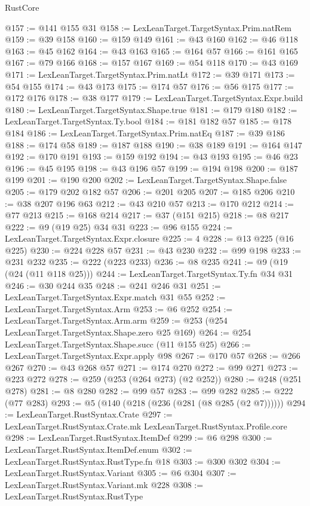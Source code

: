 \begin{lexlean}{RustCore}
\begin{coremodule}
@157 := @141 @155 @31
@158 := LexLeanTarget.TargetSyntax.Prim.natRem
@159 := @39 @158
@160 := @159 @149
@161 := @43 @160
@162 := @46 @118
@163 := @45 @162
@164 := @43 @163
@165 := @164 @57
@166 := @161 @165
@167 := @79 @166
@168 := @157 @167
@169 := @54 @118
@170 := @43 @169
@171 := LexLeanTarget.TargetSyntax.Prim.natLt
@172 := @39 @171
@173 := @54 @155
@174 := @43 @173
@175 := @174 @57
@176 := @56 @175
@177 := @172 @176
@178 := @38 @177
@179 := LexLeanTarget.TargetSyntax.Expr.build
@180 := LexLeanTarget.TargetSyntax.Shape.true
@181 := @179 @180
@182 := LexLeanTarget.TargetSyntax.Ty.bool
@184 := @181 @182 @57
@185 := @178 @184
@186 := LexLeanTarget.TargetSyntax.Prim.natEq
@187 := @39 @186
@188 := @174 @58
@189 := @187 @188
@190 := @38 @189
@191 := @164 @147
@192 := @170 @191
@193 := @159 @192
@194 := @43 @193
@195 := @46 @23
@196 := @45 @195
@198 := @43 @196 @57
@199 := @194 @198
@200 := @187 @199
@201 := @190 @200
@202 := LexLeanTarget.TargetSyntax.Shape.false
@205 := @179 @202 @182 @57
@206 := @201 @205
@207 := @185 @206
@210 := @38 @207 @196 @63
@212 := @43 @210 @57
@213 := @170 @212
@214 := @77 @213
@215 := @168 @214
@217 := @37 (@151 @215)
@218 := @8 @217
@222 := @9 (@19 @25) @34 @31
@223 := @96 @155
@224 := LexLeanTarget.TargetSyntax.Expr.closure
@225 := 4
@228 := @13 @225 (@16 @225)
@230 := @224 @228 @57
@231 := @43 @230
@232 := @99 @198
@233 := @231 @232
@235 := @222 (@223 @233)
@236 := @8 @235
@241 := @9 (@19 (@24 (@11 @118 @25)))
@244 := LexLeanTarget.TargetSyntax.Ty.fn @34 @31
@246 := @30 @244 @35
@248 := @241 @246 @31
@251 := LexLeanTarget.TargetSyntax.Expr.match @31 @55
@252 := LexLeanTarget.TargetSyntax.Arm
@253 := @6 @252
@254 := LexLeanTarget.TargetSyntax.Arm.arm
@259 := @253 (@254 LexLeanTarget.TargetSyntax.Shape.zero @25 @169)
@264 := @254 LexLeanTarget.TargetSyntax.Shape.succ (@11 @155 @25)
@266 := LexLeanTarget.TargetSyntax.Expr.apply @98
@267 := @170 @57
@268 := @266 @267
@270 := @43 @268 @57
@271 := @174 @270
@272 := @99 @271
@273 := @223 @272
@278 := @259 (@253 (@264 @273) (@2 @252))
@280 := @248 (@251 @278)
@281 := @8 @280
@282 := @99 @57
@283 := @99 @282
@285 := @222 (@77 @283)
@293 := @5 (@140 (@218 (@236 (@281 (@8 @285 (@2 @7))))))
@294 := LexLeanTarget.RustSyntax.Crate
@297 := LexLeanTarget.RustSyntax.Crate.mk LexLeanTarget.RustSyntax.Profile.core
@298 := LexLeanTarget.RustSyntax.ItemDef
@299 := @6 @298
@300 := LexLeanTarget.RustSyntax.ItemDef.enum
@302 := LexLeanTarget.RustSyntax.RustType.fn @18
@303 := @300 @302
@304 := LexLeanTarget.RustSyntax.Variant
@305 := @6 @304
@307 := LexLeanTarget.RustSyntax.Variant.mk @228
@308 := LexLeanTarget.RustSyntax.RustType

\end{coremodule}
\end{lexlean}
